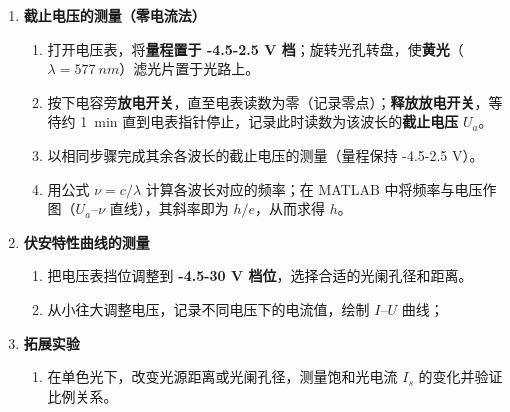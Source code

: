 \documentclass[]{../../templates/Report}%
\begin{document}
\begin{enumerate}[label=(\arabic*)]
    \begin{enumerate}[label=\arabic*)]
        \item 将所有器件（汞灯、聚光/滤光组件等）依次安装在光具座上，调好光轴同心度；重点\textbf{将汞灯出射光聚焦到光电管的正中心}。
        \item 按原理图完成\textbf{放大电路板}的连接，并在\textbf{其输出端接上测量用电压表}；核对接地与极性，开启设备预热约 \SI{20}{min}。
    \end{enumerate}
    \item \textbf{截止电压的测量（零电流法）}
    \begin{enumerate}[label=\arabic*)]
        \item 打开电压表，将\textbf{量程置于 -4.5-2.5 V 档}；旋转光孔转盘，使\textbf{黄光}（$\lambda=\SI{577}{nm}$）滤光片置于光路上。
        \item 按下电容旁\textbf{放电开关}，直至电表读数为零（记录零点）；\textbf{释放放电开关}，等待约 \SI{1}{min} 直到电表指针停止，记录此时读数为该波长的\textbf{截止电压} $U_a$。
        \item 以相同步骤完成其余各波长的截止电压的测量（量程保持 -4.5-2.5 V）。
        \item 用公式 $\nu=c/\lambda$ 计算各波长对应的频率；在 MATLAB 中将频率与电压作图（$U_a$–$\nu$ 直线），其斜率即为 $h/e$，从而求得 $h$。
    \end{enumerate}
    \item \textbf{伏安特性曲线的测量}
    \begin{enumerate}[label=\arabic*)]
        \item 把电压表挡位调整到 \textbf{-4.5-30 V 档位}，选择合适的光阑孔径和距离。
        \item 从小往大调整电压，记录不同电压下的电流值，绘制 $I$–$U$ 曲线；
    \end{enumerate}
    \item \textbf{拓展实验}
    \begin{enumerate}[label=\arabic*)]
        \item 在单色光下，改变光源距离或光阑孔径，测量饱和光电流 $I_s$ 的变化并验证比例关系。
    \end{enumerate}
\end{enumerate}
\end{document}
